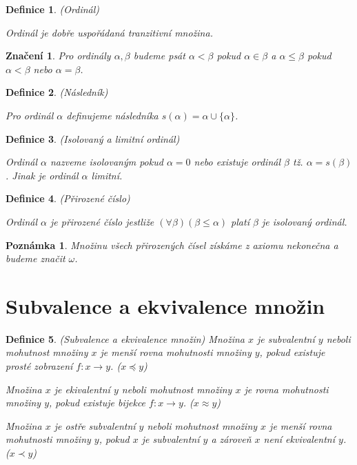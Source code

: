 \documentclass[a4paper,10pt,titlepage]{article} \usepackage[utf8]{inputenc}
\newtheorem{define}{Definice}
\newtheorem*{notation}{Značení}
\newtheorem*{remark}{Poznámka}
\begin{document}
\begin{define}
(Ordinál)

Ordinál je dobře uspořádaná tranzitivní množina.
\end{define}

\begin{notation}
Pro ordinály $\alpha, \beta$ budeme psát $\alpha < \beta$ pokud $\alpha \in \beta$ a
$\alpha \leq \beta$ pokud $\alpha < \beta$ nebo $\alpha = \beta$.
\end{notation}

\begin{define}
(Následník)

Pro ordinál $\alpha$ definujeme následníka $s(\alpha ) = \alpha \cup \{\alpha\}$.
\end{define}

\begin{define}
(Isolovaný a limitní ordinál)

Ordinál $\alpha$ nazveme isolovaným pokud $\alpha = 0$ nebo existuje ordinál $\beta$ tž. $\alpha = s(\beta)$.
Jinak je ordinál $\alpha$ limitní.
\end{define}

\begin{define}
(Přirozené číslo)

Ordinál $\alpha$ je přirozené číslo jestliže $(\forall \beta) (\beta \leq \alpha)$ platí $\beta$ je isolovaný ordinál.
\end{define}

\begin{remark}
Množinu všech přirozených čísel získáme z axiomu nekonečna a budeme značit $\omega$.
\end{remark}

\section{Subvalence a ekvivalence množin}
\begin{define}
(Subvalence a ekvivalence množin)
Množina $x$ je subvalentní $y$ neboli mohutnost množiny $x$ je menší rovna mohutnosti množiny $y$,
pokud existuje prosté zobrazení $f: x \rightarrow y$. ($x \preceq y$)

Množina $x$ je ekivalentní $y$ neboli mohutnost množiny $x$ je rovna mohutnosti množiny $y$,
pokud existuje bijekce $f: x \rightarrow y$. ($x \approx y$)

Množina $x$ je ostře subvalentní $y$ neboli mohutnost množiny $x$ je menší rovna mohutnosti množiny $y$,
pokud $x$ je subvalentní $y$ a zároveň $x$ není ekvivalentní $y$.  ($x \prec y$)
\end{define}
\end{document}
